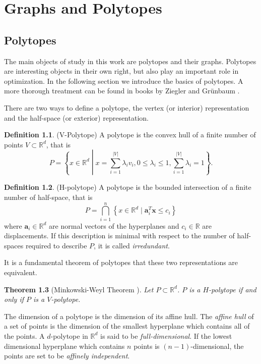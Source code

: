 \documentclass[a4paper,12pt]{book}
\theoremstyle{plain}
\newtheorem{theorem}{Theorem}[section]
\theoremstyle{definition}
\newtheorem{definition}[theorem]{Definition}
\begin{document}
\chapter{Graphs and Polytopes}
\label{mathchapter}

\section{Polytopes}

The main objects of study in this work are polytopes and their graphs. Polytopes are 
interesting 
objects in their own right, but also play an important role in
optimization. In the following section we introduce the basics of polytopes. 
A more thorough treatment can be found in books by Ziegler \cite{PolyLec} 
and Gr\"unbaum \cite{Grunbaum69convexpolytopes}. 

There are 
two ways to define a polytope, the vertex (or interior) representation and the 
half-space (or exterior) representation.

\begin{definition}
(V-Polytope) A polytope is the convex hull of a finite number of points $V 
\subset \mathbb{R}^d$, that is 
\begin{equation}
 P = \left\{x\in \mathbb{R}^d \middle| x = \sum_{i=1}^{|V|} \lambda_i v_i, 
0\leq \lambda_i \leq 1, \sum_{i=1}^{|V|} \lambda_i = 1 \right\}.
\end{equation}

\end{definition}

\begin{definition}
 (H-polytope) A polytope is the bounded intersection of a finite number of 
half-space, that is
\begin{equation}
 P = \bigcap_{i=1}^n \left\{x \in \mathbb{R}^d \mid \mathbf{a}_i^T \mathbf{x} 
\leq 
c_i \right\}
\end{equation}
where $\mathbf{a}_i \in \mathbb{R}^d$ are normal vectors of the hyperplanes and 
$c_i \in 
\mathbb{R}$ are displacements. If this description is minimal with respect to 
the number of half-spaces required to describe $P$, it is called 
\textit{irredundant}.
\end{definition}

It is a fundamental theorem of polytopes that these two representations are 
equivalent.
\begin{theorem}[Minkowski-Weyl Theorem {\cite[Thm. 1.1.]{PolyLec}}] Let $P \subset \mathbb{R}^d$. 
$P$ is a $H$-polytope if and only if $P$ is a $V$-polytope.
\end{theorem}
The dimension of a polytope is the dimension of its affine hull. The \textit{affine 
hull} of a set of points is the dimension of the smallest hyperplane which 
contains all of the points. A $d$-polytope in $\mathbb{R}^d$ is said to be 
\textit{full-dimensional}. If the lowest dimensional hyperplane which contains 
$n$ points is $(n-1)$-dimensional, the points are set to be \textit{affinely 
independent}.
\end{document}
